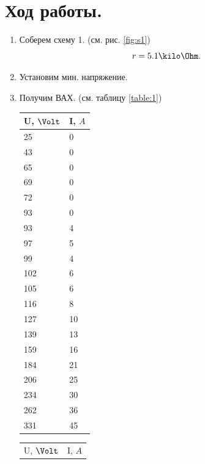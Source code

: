 \documentclass{report}
\begin{document}
\section{Ход работы.}
\begin{enumerate}
	\item Соберем схему 1. (см. рис. \ref{fig:s1})
	      \[
		      r = 5.1 \kilo \Ohm
		      .\]
	\item Установим мин. напряжение.
	\item Получим ВАХ. (см. таблицу \ref{table:1})
	      \begin{table}[H]
		      \centering
		      \begin{tabular}{|l|l|}
			      \hline
			      U, $ \Volt $ & I, $ A $ \\
			      \hline
			      25           & 0        \\
			      43           & 0        \\
			      65           & 0        \\
			      69           & 0        \\
			      72           & 0        \\
			      93           & 0        \\
			      93           & 4        \\
			      97           & 5        \\
			      99           & 4        \\
			      102          & 6        \\
			      105          & 6        \\
			      116          & 8        \\
			      127          & 10       \\
			      139          & 13       \\
			      159          & 16       \\
			      184          & 21       \\
			      206          & 25       \\
			      234          & 30       \\
			      262          & 36       \\
			      331          & 45       \\
			      \hline
		      \end{tabular}
		      \hspace{1cm}
		      \begin{tabular}{|l|l|}
			      \hline
			      U, $ \Volt $ & I, $ A $ \\

\end{tabular}
\end{table}
\end{enumerate}
\end{document}
